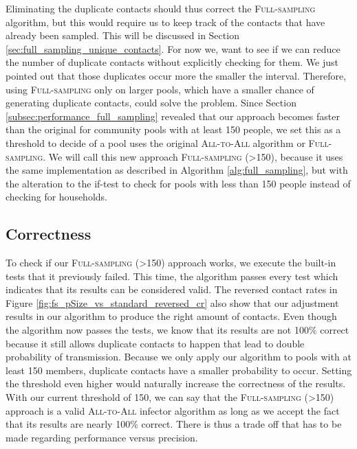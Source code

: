 Eliminating the duplicate contacts should thus correct the \textsc{Full-sampling} algorithm, but this would require us to keep track of the contacts that have already been sampled. This will be discussed in Section \ref{sec:full_sampling_unique_contacts}. For now we, want to see if we can reduce the number of duplicate contacts without explicitly checking for them. We just pointed out that those duplicates occur more the smaller the interval. Therefore, using \textsc{Full-sampling} only on larger pools, which have a smaller chance of generating duplicate contacts, could solve the problem. Since Section \ref{subsec:performance_full_sampling} revealed that our approach becomes faster than the original for community pools with at least 150 people, we set this as a threshold to decide of a pool uses the original \textsc{All-to-All} algorithm or \textsc{Full-sampling}. We will call this new approach \textsc{Full-sampling (>150)}, because it uses the same implementation as described in Algorithm \ref{alg:full_sampling}, but with the alteration to the if-test to check for pools with less than 150 people instead of checking for households.

\subsection{Correctness}
\label{subsec:correctness_adjusted_full_sampling}
To check if our \textsc{Full-sampling (>150)} approach works, we execute the built-in tests that it previously failed. This time, the algorithm passes every test which indicates that its results can be considered valid. The reversed contact rates in Figure \ref{fig:fs_pSize_vs_standard_reversed_cr} also show that our adjustment results in our algorithm to produce the right amount of contacts. Even though the algorithm now passes the tests, we know that its results are not 100\% correct because it still allows duplicate contacts to happen that lead to double probability of transmission. Because we only apply our algorithm to pools with at least 150 members, duplicate contacts have a smaller probability to occur. Setting the threshold even higher would naturally increase the correctness of the results. With our current threshold of 150, we can say that the \textsc{Full-sampling (>150)} approach is a valid \textsc{All-to-All} infector algorithm as long as we accept the fact that its results are nearly 100\% correct. There is thus a trade off that has to be made regarding performance versus precision.

